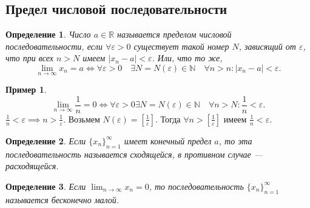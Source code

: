 \documentclass[a4paper,12pt]{article} %
\newtheorem{definition}{Определение}[section]
\theoremstyle{remark}
\theoremstyle{definition}
\newtheorem{exmp}{Пример}[section]
\begin{document}
\subsection{Предел числовой последовательности}
\begin{definition}
	Число $a\in\mathbb{R}$ называется пределом числовой последовательности, если $\forall \varepsilon>0$ существует
    такой номер $N$, зависящий от $\varepsilon$, что при всех $n>N$ имеем $|x_n - a| < \varepsilon$. Или, что то же,
    \[\lim_{n \to \infty} x_n = a \iff \forall \varepsilon>0 \quad \exists N = N(\varepsilon)\in \mathbb{N} \quad \forall n > n
    : |x_n-a| < \varepsilon.\] 
\end{definition}
\begin{exmp}
    \[ \lim_{n \to \infty} \frac{1}{n} = 0 \iff \forall \varepsilon>0 \exists N=N(\varepsilon) \in \mathbb{N} \quad 
    \forall n>N : \frac{1}{n} < \varepsilon .\] 
    $\displaystyle \frac{1}{n} < \varepsilon \implies n > \frac{1}{\varepsilon}$.
    Возьмем $\displaystyle N(\varepsilon) = \left[\frac{1}{\varepsilon}\right]$. 
    Тогда $\displaystyle \forall n>\left[\frac{1}{\varepsilon}\right]$ имеем $\displaystyle \frac{1}{n} < \varepsilon.$
\end{exmp}


\begin{definition}
	Если $\{x_n\}_{n=1}^{\infty}$ имеет конечный предел $a$, то эта последовательность называется сходящейся,
    в противном случае --- расходящейся.
\end{definition}

\begin{definition}
	Если $\lim_{n \to \infty} x_n = 0$, то последовательность $\{x_n\}_{n=1}^{\infty}$ называется бесконечно малой.
\end{definition}
\end{document}
